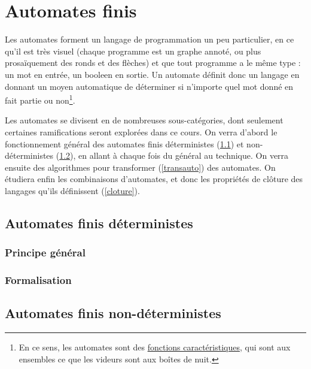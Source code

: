 \chapter{Automates finis}
\label{automates}



Les automates forment un langage de programmation un peu particulier, en ce qu'il est très visuel (chaque programme est un graphe annoté, ou plus prosaïquement des ronds et des flèches) et que tout programme a le même type : un mot en entrée, un booleen en sortie. Un automate définit donc un langage en donnant un moyen automatique de déterminer si n'importe quel mot donné en fait partie ou non\footnote{En ce sens, les automates sont des \href{https://fr.wikipedia.org/wiki/Fonction_caract\%C3\%A9ristique_(th\%C3\%A9orie_des_ensembles)}{fonctions caractéristiques}, qui sont aux ensembles ce que les videurs sont aux boîtes de nuit.}.

Les automates se divisent en de nombreuses sous-catégories, dont seulement certaines ramifications seront explorées dans ce cours. On verra d'abord le fonctionnement général des automates finis déterministes (\ref{DFA}) et non-déterministes (\ref{NDFA}), en allant à chaque fois du général au technique. On verra ensuite des algorithmes pour transformer (\ref{transauto}) des automates. On étudiera enfin les combinaisons d'automates, et donc les propriétés de clôture des langages qu'ils définissent (\ref{cloture}).

\section{Automates finis déterministes}
\label{DFA}

\subsection{Principe général}

\subsection{Formalisation}

\section{Automates finis non-déterministes}
\label{NDFA}

